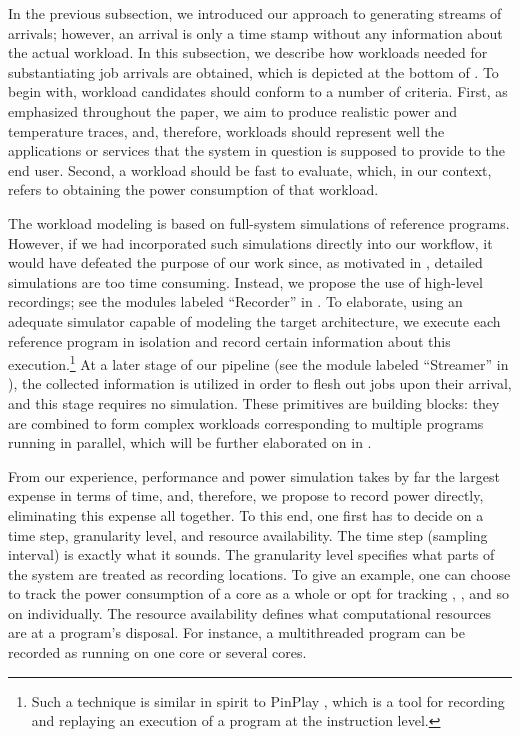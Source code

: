 In the previous subsection, we introduced our approach to generating streams of
arrivals; however, an arrival is only a time stamp without any information about
the actual workload. In this subsection, we describe how workloads needed for
substantiating job arrivals are obtained, which is depicted at the bottom of
. To begin with, workload candidates should conform to a
number of criteria. First, as emphasized throughout the paper, we aim to produce
realistic power and temperature traces, and, therefore, workloads should
represent well the applications or services that the system in question is
supposed to provide to the end user. Second, a workload should be fast to
evaluate, which, in our context, refers to obtaining the power consumption of
that workload.

The workload modeling is based on full-system simulations of reference programs.
However, if we had incorporated such simulations directly into our workflow, it
would have defeated the purpose of our work since, as motivated in
, detailed simulations are too time consuming. Instead, we
propose the use of high-level recordings; see the modules labeled ``Recorder''
in . To elaborate, using an adequate simulator capable of
modeling the target architecture, we execute each reference program in isolation
and record certain information about this execution.\footnote{Such a technique
is similar in spirit to PinPlay \cite{patil2010}, which is a tool for recording
and replaying an execution of a program at the instruction level.} At a later
stage of our pipeline (see the module labeled ``Streamer'' in
), the collected information is utilized in order to flesh out
jobs upon their arrival, and this stage requires no simulation. These primitives
are building blocks: they are combined to form complex workloads corresponding
to multiple programs running in parallel, which will be further elaborated on in
.

From our experience, performance and power simulation takes by far the largest
expense in terms of time, and, therefore, we propose to record power directly,
eliminating this expense all together. To this end, one first has to decide on a
time step, granularity level, and resource availability. The time step (sampling
interval) is exactly what it sounds. The granularity level specifies what parts
of the system are treated as recording locations. To give an example, one can
choose to track the power consumption of a core as a whole or opt for tracking
, , and so on individually. The resource availability defines
what computational resources are at a program's disposal. For instance, a
multithreaded program can be recorded as running on one core or several cores.

